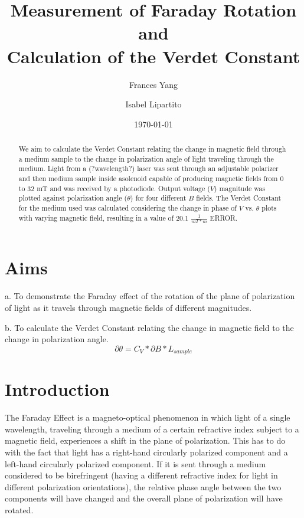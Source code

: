 \documentclass[prb,preprint]{revtex4-1}
\begin{document}
\title{Measurement of Faraday Rotation and \\ Calculation of the Verdet Constant }

\author{Frances Yang}

\author{Isabel Lipartito}

\date{\today}

\begin{abstract}
We aim to calculate the Verdet Constant relating the change in magnetic field through a medium sample to the change in polarization angle of light traveling through the medium.  Light from a (?wavelength?) laser was sent through an adjustable polarizer and then medium sample inside asolenoid capable of producing magnetic fields from 0 to 32 mT and was received by a photodiode.  Output voltage ($V$) magnitude was plotted against polarization angle ($\theta$) for four different $B$ fields.  The Verdet Constant for the medium used was calculated considering the change in phase of $V$ vs. $\theta$ plots with varying magnetic field, resulting in a value of 20.1 $\frac{1}{mT*m}$ ERROR.
\end{abstract}

\maketitle 
\section{Aims}
a.  To demonstrate the Faraday effect of the rotation of the plane of polarization of light as it travels through magnetic fields of different magnitudes.

b.  To calculate the Verdet Constant relating the change in magnetic field to the change in polarization angle.
\begin{equation}
\partial \theta =C_{V}*\partial B*L{_{sample}}
\end{equation}

\section{Introduction} 

{The Faraday Effect is a magneto-optical phenomenon in which light of a single wavelength, traveling through a medium of a certain refractive index subject to a magnetic field, experiences a shift in the plane of polarization.  This has to do with the fact that light has a right-hand circularly polarized component and a left-hand circularly polarized component.  If it is sent through a medium considered to be birefringent (having a different refractive index for light in different polarization orientations), the relative phase angle between the two components will have changed and the overall plane of polarization will have rotated.}
\end{document}

